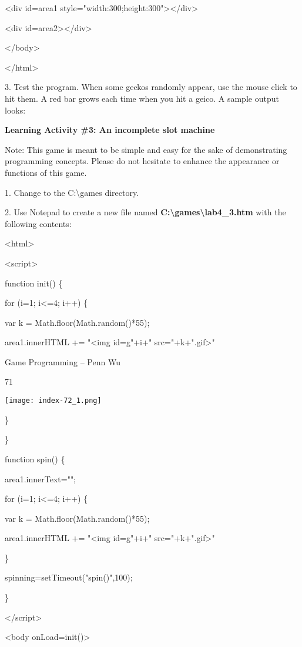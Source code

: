 \documentclass[
]{article}
\begin{document}
\textless div id=area1
style="width:300;height:300"\textgreater\textless/div\textgreater{}

\textless div id=area2\textgreater\textless/div\textgreater{}

\textless/body\textgreater{}

\textless/html\textgreater{}

3. Test the program. When some geckos randomly appear, use the mouse
click to hit them. A red bar grows each time when you hit a geico. A
sample output looks:

\textbf{Learning Activity \#3: An incomplete slot machine}

Note: This game is meant to be simple and easy for the sake of
demonstrating programming concepts. Please do not hesitate to enhance
the appearance or functions of this game.

1. Change to the C:\textbackslash games directory.

2. Use Notepad to create a new file named
\textbf{C:\textbackslash games\textbackslash lab4\_3.htm} with the
following contents:

\textless html\textgreater{}

\textless script\textgreater{}

function init() \{

for (i=1; i\textless=4; i++) \{

var k = Math.floor(Math.random()*55);

area1.innerHTML += "\textless img id=g"+i+" src="+k+".gif\textgreater"

Game Programming -- Penn Wu

71

\protect\hypertarget{index_split_005.htmlux5cux23p72}{}{}\texttt{[image: index-72\_1.png]}

\}

\}

function spin() \{

area1.innerText="";

for (i=1; i\textless=4; i++) \{

var k = Math.floor(Math.random()*55);

area1.innerHTML += "\textless img id=g"+i+" src="+k+".gif\textgreater"

\}

spinning=setTimeout("spin()",100);

\}

\textless/script\textgreater{}

\textless body onLoad=init()\textgreater{}
\end{document}
